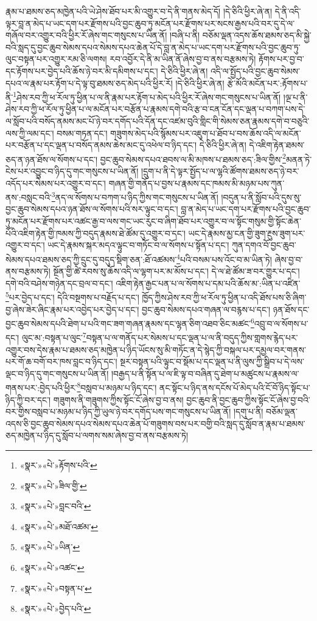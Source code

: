 རྣམ་པ་ཐམས་ཅད་མཁྱེན་པའི་ཡེ་ཤེས་ཐོབ་པར་མི་འགྱུར་བ་དེ་ནི་གནས་མེད་དོ། །དེ་ཅིའི་ཕྱིར་ཞེ་ན། དེ་ནི་འདི་ལྟར་བླ་ན་མེད་པ་ཡང་དག་པར་རྫོགས་པའི་བྱང་ཆུབ་ཏུ་མངོན་པར་རྫོགས་པར་སངས་རྒྱས་པའི་བར་དུ་དེ་ལ་གཞོལ་བར་འགྱུར་བའི་ཕྱིར་རོ་ཞེས་གང་གསུངས་པ་ཡིན་ནོ། །བཞི་པ་ནི། བཅོམ་ལྡན་འདས་ཆོས་ཐམས་ཅད་མི་སྐྱེ་བའི་སླད་དུ་བྱང་ཆུབ་སེམས་དཔའ་སེམས་དཔའ་ཆེན་པོ་དེ་བླ་ན་མེད་པ་ཡང་དག་པར་རྫོགས་པའི་བྱང་ཆུབ་ཏུ་ལུང་བསྟན་པར་འགྱུར་རམ་ཅི་ལགས། རབ་འབྱོར་དེ་ནི་མ་ཡིན་ནོ་ཞེས་བྱ་བ་ནས་བརྩམས་ཏེ། རྟོགས་པར་བྱ་བ་དང་རྟོགས་པར་བྱེད་པའི་ཆོས་ཉེ་བར་མི་དམིགས་པ་དང་། དེ་ཅིའི་ཕྱིར་ཞེ་ན། འདི་ལ་སྤྱོད་པའི་བྱང་ཆུབ་སེམས་དཔའ་ལ་རྣམ་པར་རྟོག་པ་དེ་ལྟ་བུ་ཐམས་ཅད་མེད་པའི་ཕྱིར་རོ། །དེ་ཅིའི་ཕྱིར་ཞེ་ན། རྩེ་མོའི་མངོན་པར་:རྟོགས་པ་ནི་\footnote{«སྣར་»«པེ་»རྟོགས་པའི་}ཤེས་རབ་ཀྱི་ཕ་རོལ་ཏུ་ཕྱིན་པ་ལ་ནི་རྣམ་པར་རྟོག་པ་མེད་པའི་ཕྱིར་རོ་ཞེས་གང་གསུངས་པ་ཡིན་ནོ། །ལྔ་པ་ནི་ཤེས་རབ་ཀྱི་ཕ་རོལ་ཏུ་ཕྱིན་པ་ལ་མངོན་པར་བརྩོན་པ་རྣམས་དགེ་བའི་རྩ་བ་ངན་ངོན་དང་ལྡན་པ་བཀག་པས་དེ་ལ་སློབ་པའི་བསོད་ནམས་མང་པོ་ཉེ་བར་དགོད་པའི་དོན་དང་འཛམ་བུའི་གླིང་གི་སེམས་ཅན་རྣམས་དགེ་བ་བཅུའི་ལས་ཀྱི་ལམ་དང་། བསམ་གཏན་དང་། གཟུགས་མེད་པའི་སྙོམས་པར་འཇུག་པ་ཐོབ་པ་བས་ཆོས་འདི་ལ་མངོན་པར་བརྩོན་པ་དང་ལྡན་པ་བསོད་ནམས་ཆེས་མང་དུ་འཕེལ་བ་ཉིད་དང་། དེ་ཅིའི་ཕྱིར་ཞེ་ན། དེ་འཇིག་རྟེན་ཐམས་ཅད་ན་ཉན་ཐོས་ལ་སོགས་པ་དང་། བྱང་ཆུབ་སེམས་དཔའ་ཐབས་ལ་མི་མཁས་པ་ཐམས་ཅད་:ཟིལ་གྱིས་\footnote{«སྣར་»«པེ་»ཟིལ་གྱི་}མནན་ཏེ་ངེས་པར་འབྱུང་བ་ཉིད་དུ་གང་གསུངས་པ་ཡིན་ནོ། །དྲུག་པ་ནི་དེ་ལྟར་སྤྱོད་པ་ལ་ལྷའི་ཚོགས་ཐམས་ཅད་ཉེ་བར་འདོད་པར་སེམས་པར་འགྱུར་བ་དང་། གཞན་གྱི་གནོད་པ་བྱས་པ་རྣམས་དང་ཁམས་མི་མཉམ་པས་ཀུན་ནས་:བསླང་བའི་\footnote{«སྣར་»«པེ་»བླང་བའི་}ནད་ལ་སོགས་པ་བཀག་པ་ཉིད་ཀྱིས་གང་གསུངས་པ་ཡིན་ནོ། །བདུན་པ་ནི་སློབ་པའི་དུས་སུ་བྱང་ཆུབ་སེམས་དཔའ་ཉན་ཐོས་ལ་སོགས་པའི་སར་ལྟུང་བ་དང་། བླ་ན་མེད་པ་ཡང་དག་པར་རྫོགས་པའི་བྱང་ཆུབ་ཏུ་མངོན་པར་རྫོགས་པར་འཚང་རྒྱ་བ་ལས་གང་ཡང་རུང་བ་ཞིག་ཐོབ་པར་འགྱུར་བ་ལ་སྟོང་གསུམ་གྱི་སྟོང་ཆེན་པོའི་འཇིག་རྟེན་གྱི་ཁམས་ཀྱི་བདུད་རྣམས་ཐེ་ཚོམ་དུ་འགྱུར་བ་དང་། ཡང་དེ་རྣམས་མྱ་ངན་གྱི་ཟུག་རྔུས་ཟུག་པར་འགྱུར་བ་དང་། ཡང་དེ་རྣམས་སྐར་མདའ་ལྟུང་བ་གཏོང་བ་ལ་སོགས་པ་སྟོན་པ་དང་། ཀུན་དགའ་བོ་བྱང་ཆུབ་སེམས་དཔའ་ཐམས་ཅད་ཀྱི་དྲུང་དུ་བདུད་སྡིག་ཅན་:ཐོ་འཚམས་\footnote{«སྣར་»«པེ་»མཐོ་འཚམ་}པའི་བསམ་པས་འོང་བ་མ་ཡིན་ཏེ། ཞེས་བྱ་བ་ནས་བརྩམས་ཏེ། སྔོན་གྱི་ཚེ་རབས་སུ་ཆོས་འདི་ལ་ལྷག་པར་མ་མོས་པ་དང་། དེ་ལ་ཐེ་ཚོམ་ཟ་བར་གྱུར་པ་དང་། དགེ་བའི་བཤེས་གཉེན་དང་བྲལ་བ་དང་། འཇིག་རྟེན་རྒྱང་པན་པ་ལ་སོགས་པ་དམ་པའི་ཆོས་མ་:ཡིན་པ་འཛིན་\footnote{«སྣར་»«པེ་»ཡིན་}པར་བྱེད་པ་དང་། དེའི་བསྔགས་པ་བརྗོད་པ་དང་། ཁྱོད་ཀྱིས་ཤེས་རབ་ཀྱི་ཕ་རོལ་ཏུ་ཕྱིན་པ་འདི་ཐོས་པས་ཅི་ཞིག་བྱ་ཞེས་ཟེར་ཞིང་རྣམ་པར་འབྱེད་པར་བྱེད་པ་དང་། བྱང་ཆུབ་སེམས་དཔའ་གཞན་ལ་བརྙས་པ་དང་། ཉན་ཐོས་དང་བྱང་ཆུབ་སེམས་དཔའི་ཐེག་པ་པའི་གང་ཟག་གཞན་རྣམས་དང་ལྷན་ཅིག་འཐབ་ཅིང་མཚང་\footnote{«སྣར་»«པེ་»འཚང་}འབྲུ་བ་ལ་སོགས་པ་དང་། ལུང་མ་:བསྟན་པ་ལུང་\footnote{«སྣར་»«པེ་»བསྟན་པ་}བསྟན་པ་ལ་གནོད་པར་སེམས་པ་དང་ལྡན་པ་ལ་ནི་བདུད་ཀྱིས་གླགས་རྙེད་པར་འགྱུར་བས་དེས་རྣམ་པ་ཐམས་ཅད་མཁྱེན་པ་ཉིད་ཡོངས་སུ་མི་གཏོང་ན་དེ་སྙེད་ཀྱི་བསྐལ་པར་དམྱལ་བར་གནས་པར་གོ་ཆ་བགོ་བར་ཁས་བླང་བ་ཉིད་དང་། སྔར་བསྟན་པའི་ལྟུང་བ་སྡོམ་པ་དང་ལྡན་པ་ནི་ལུས་ཀྱི་སྒྲིབ་པ་དེ་ལས་ལྡང་བ་ཉིད་དུ་གང་གསུངས་པ་ཡིན་ནོ། །བརྒྱད་པ་ནི་སྟོན་པ་ལ་ཇི་ལྟ་བ་བཞིན་དུ་ཐེག་པ་མཚུངས་པ་རྣམས་ལ་གནས་པར་:བྱེད་པའི་ཕྱིར་\footnote{«སྣར་»«པེ་»བྱེད་པའི་}བསླབ་པ་མཉམ་པ་ཉིད་དང་། ནང་སྟོང་པ་ཉིད་ནས་དངོས་པོ་མེད་པའི་ངོ་བོ་ཉིད་སྟོང་པ་ཉིད་ཀྱི་བར་དང་། གཟུགས་ནི་གཟུགས་ཀྱིས་སྟོང་ངོ་ཞེས་བྱ་བ་ནས། བྱང་ཆུབ་ནི་བྱང་ཆུབ་ཀྱིས་སྟོང་ངོ་ཞེས་བྱ་བའི་བར་གྱིས་བསླབ་པ་མཉམ་པ་ཉིད་ཀྱི་ཡུལ་ཉེ་བར་དགོད་པས་གང་གསུངས་པ་ཡིན་ནོ། །དགུ་པ་ནི། བཅོམ་ལྡན་འདས་ཅི་བྱང་ཆུབ་སེམས་དཔའ་སེམས་དཔའ་ཆེན་པོ་གཟུགས་བས་པར་བགྱི་བའི་སླད་དུ་སློབ་ན་རྣམ་པ་ཐམས་ཅད་མཁྱེན་པ་ཉིད་དུ་སློབ་པ་ལགས་སམ་ཞེས་བྱ་བ་ནས་བརྩམས་ཏེ། 